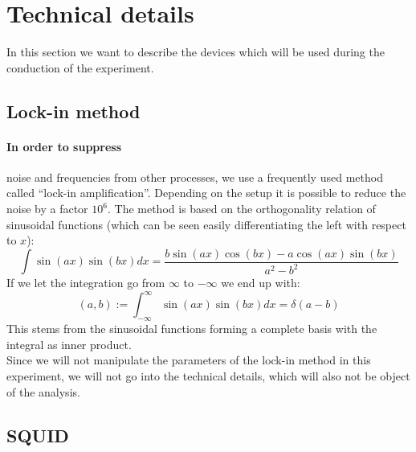 \section{Technical details}
\label{sec:technics}
In this section we want to describe the devices which will be used during the
conduction of the experiment.
\subsection{Lock-in method}
\paragraph{In order to suppress}
noise and frequencies from other processes, we use
a frequently used method called ``lock-in amplification''. Depending on the
setup it is possible to reduce the noise by a factor $10^6$. The method
is based on the orthogonality relation of sinusoidal functions (which
    can be seen easily differentiating the left with respect to $x$):
\begin{equation}
    \int \sin(a x) \sin(b x) dx =\frac{ b \sin(a x) \cos(b x)-a \cos(a x)
        \sin(b x)}{a^2-b^2}
\end{equation}
If we let the integration go from $\infty$ to $-\infty$ we end up with:
\begin{equation}
    (a,b) := \int_{-\infty}^{\infty} \sin(a x) \sin(b x) dx = \delta(a - b)
\end{equation}
This stems from the sinusoidal functions forming a complete basis with
the integral as inner product.\\
Since we will not manipulate the parameters of the lock-in method in this
experiment, we will not go into the technical details, which
will also not be object of the analysis.
\subsection{SQUID}
